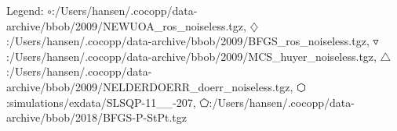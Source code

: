 Legend: {\color{NavyBlue}$\circ$}:/Users/hansen/.cocopp/data-archive/bbob/2009/NEWUOA\_ros\_noiseless.tgz, {\color{Magenta}$\diamondsuit$}:/Users/hansen/.cocopp/data-archive/bbob/2009/BFGS\_ros\_noiseless.tgz, {\color{CornflowerBlue}$\triangledown$}:/Users/hansen/.cocopp/data-archive/bbob/2009/MCS\_huyer\_noiseless.tgz, {\color{YellowGreen}$\triangle$}:/Users/hansen/.cocopp/data-archive/bbob/2009/NELDERDOERR\_doerr\_noiseless.tgz, {\color{red}$\varhexagon$}:simulations/exdata/SLSQP-11\_\_-207, {\color{cyan}$\pentagon$}:/Users/hansen/.cocopp/data-archive/bbob/2018/BFGS-P-StPt.tgz
